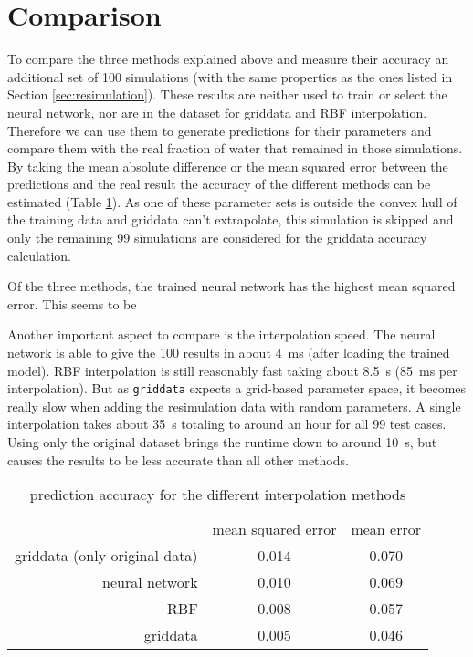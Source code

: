 \section{Comparison}

To compare the three methods explained above and measure their accuracy an additional set of 100 simulations (with the same properties as the ones listed in Section \ref{sec:resimulation}). These results are neither used to train or select the neural network, nor are in the dataset for griddata and RBF interpolation. Therefore we can use them to generate predictions for their parameters and compare them with the real fraction of water that remained in those simulations. By taking the mean absolute difference or the mean squared error between the predictions and the real result the accuracy of the different methods can be estimated (Table \ref{tab:comparison}). As one of these parameter sets is outside the convex hull of the training data and griddata can't extrapolate, this simulation is skipped and only the remaining 99 simulations are considered for the griddata accuracy calculation. 

Of the three methods, the trained neural network has the highest mean squared error. This seems to be

Another important aspect to compare is the interpolation speed. The neural network is able to give the 100 results in about \SI{4}{\milli\second} (after loading the trained model). RBF interpolation is still reasonably fast taking about \SI{8.5}{\second} (\SI{85}{\milli\second} per interpolation). But as \texttt{griddata} expects a grid-based parameter space, it becomes really slow when adding the resimulation data with random parameters. A single interpolation takes about \SI{35}{\second} totaling to around an hour for all 99 test cases. Using only the original dataset brings the runtime down to around \SI{10}{\second}, but causes the results to be less accurate than all other methods.

\begin{table}
	\centering
	\begin{tabular}{rcc}
		                              & {mean squared error} & {mean error} \\
		griddata (only original data) &        0.014         &    0.070     \\
		               neural network &        0.010         &    0.069     \\
		                          RBF &        0.008         &    0.057     \\
		                     griddata &        0.005         &    0.046
	\end{tabular}
	\caption{prediction accuracy for the different interpolation methods}
	\label{tab:comparison}
\end{table}